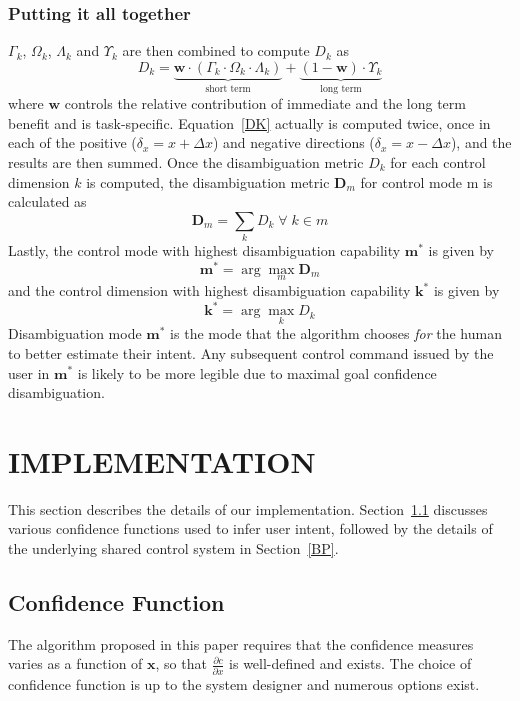 \documentclass[conference]{IEEEtran}
\newcommand{\argmax}{\arg\!\max}
\begin{document}
\subsubsection*{Putting it all together}
$\Gamma_{k}$, $\Omega_{k}$, $\Lambda_{k}$ and $\Upsilon_{k}$ are then combined to compute $D_{k}$ as 
\begin{equation}\label{DK}
D_{k} = \underbrace{\boldsymbol{w}\cdot(\Gamma_{k}\cdot \Omega_{k}\cdot\Lambda_{k})}_{\text{short term}} + \underbrace{(1 - \boldsymbol{w})\cdot \Upsilon_{k}}_{\text{long term}}
\end{equation}
where $\boldsymbol{w}$ controls the relative contribution of immediate and the long term benefit and is task-specific. Equation~\ref{DK} actually is computed twice, once in each of the positive ($\delta_x = x + \Delta x$) and negative directions ($\delta_x = x - \Delta x$), and the results are then summed. 
Once the disambiguation metric $D_k$ for each control dimension $k$ is computed, the disambiguation metric $\boldsymbol{D}_m$ for control mode m is calculated as 
\begin{equation*}
\boldsymbol{D}_m = \sum_{k} D_{k} \; \forall \; k \in m
\end{equation*}
Lastly, the control mode with highest disambiguation capability $\boldsymbol{m}^*$ is given by
\begin{equation*}
\boldsymbol{m}^* = \argmax_m  \boldsymbol{D}_{m}
\end{equation*}
 and the control dimension with highest disambiguation capability $\boldsymbol{k}^{*}$ is given by
\begin{equation*}
\boldsymbol{k}^* = \argmax_k D_k
\end{equation*}
Disambiguation mode $\boldsymbol{m}^{*}$ is the mode that the algorithm chooses \textit{for} the human to better estimate their intent. Any subsequent control command issued by the user in $\boldsymbol{m}^*$ is likely to be more legible due to maximal goal confidence disambiguation.

\section{IMPLEMENTATION}
This section describes the details of our implementation. Section~\ref{CF} discusses various confidence functions used to infer user intent, followed by the details of the underlying shared control system in Section~\ref{BP}.
\subsection{Confidence Function}\label{CF}
The algorithm proposed in this paper requires that the confidence measures varies as a function of $\boldsymbol{x}$, so that $\frac{\partial c}{\partial x}$ is well-defined and exists. The choice of confidence function is up to the system designer and numerous options exist.
 
\end{document}
